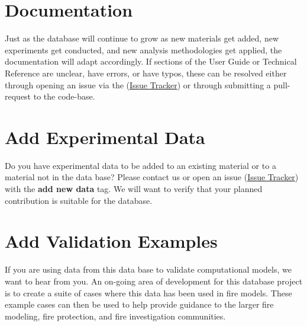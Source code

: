 \documentclass[12pt,oneside]{book}
\begin{document}
\section{Documentation}
Just as the database will continue to grow as new materials get added, new experiments get conducted, and new analysis methodologies get applied, the documentation will adapt accordingly. If sections of the User Guide or Technical Reference are unclear, have errors, or have typos, these can be resolved either through opening an issue via the (\href{https://github.com/ulfsri/fsri_materials_database/issues}{Issue Tracker}) or through submitting a pull-request to the code-base.

\section{Add Experimental Data}
Do you have experimental data to be added to an existing material or to a material not in the data base? Please contact us or open an issue (\href{https://github.com/ulfsri/fsri_materials_database/issues}{Issue Tracker}) with the {\bf add new data} tag. We will want to verify that your planned contribution is suitable for the database. 

\section{Add Validation Examples}
If you are using data from this data base to validate computational models, we want to hear from you. An on-going area of development for this database project is to create a suite of cases where this data has been used in fire models. These example cases can then be used to help provide guidance to the larger fire modeling, fire protection, and fire investigation communities.



% 
\end{document}
